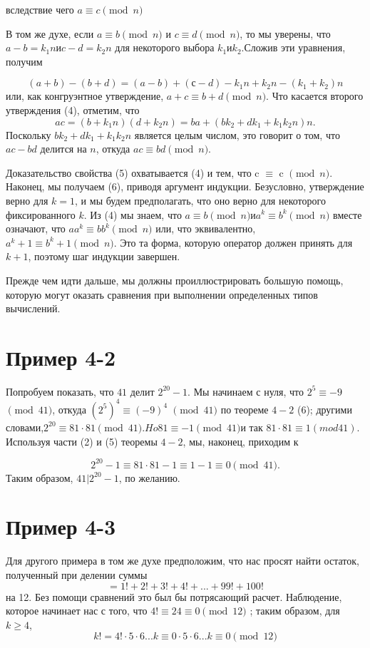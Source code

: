 \documentclass[11pt]{article}
\begin{document}
	вследствие чего $a \equiv c \pmod{n}$
	
	В том же духе, если $a \equiv b \pmod{n}$ и $c \equiv d \pmod{n}$, то мы уверены, что $a-b = k_{1}n и c-d = k_{2}n$ для некоторого выбора $k_{1} и k_{2}. $Сложив эти уравнения, получим
	
	\[
		(a + b) - (b + d) = (a-b) + (с-d) -k_{1}n + k_{2}n- (k_{1} + k_{2}) n
	\]
	или, как конгруэнтное утверждение, $a + c  \equiv b + d \pmod{n}$. Что касается второго утверждения (4), отметим, что
	\[
		 ac = (b + k_{1} n) (d + k_{2}n) = ba + (bk_{2} + dk_{1} + k_{1}k_{2}n) n.
	\]
	Поскольку $bk_{2} + dk_{1} + k_{1}k_2n$ является целым числом, это говорит о том, что $ac-bd$ делится на $n$, откуда $ac \equiv bd \pmod{n}$.
	
	Доказательство свойства (5) охватывается (4) и тем, что c $\equiv$ c $\pmod{n}$. Наконец, мы получаем (6), приводя аргумент индукции. Безусловно, утверждение верно для $k = 1$, и мы будем предполагать, что оно верно для некоторого фиксированного $k$. Из (4) мы знаем, что $a \equiv b \pmod{n} и a^{k} \equiv b^{k} \pmod{n}$ вместе означают, что $aa^{k} \equiv bb^{k} \pmod{n}$ или, что эквивалентно, $a^{k} + 1 \equiv b^{k} + 1 \pmod{n}$. Это та форма, которую оператор должен принять для $k + 1$, поэтому шаг индукции завершен.
	
	Прежде чем идти дальше, мы должны проиллюстрировать большую помощь, которую могут оказать сравнения при выполнении определенных типов вычислений.
	\section{Пример 4-2}
	Попробуем показать, что $41$ делит $2^{20} -1$. Мы начинаем с нуля, что $2^{5} \equiv - 9$ $\pmod{41}$, откуда $(2^{5})^{4} \equiv (- 9)^{4}$ $\pmod{41}$ по теореме $4-2$ (6); другими словами,$ 2^{20} \equiv 81 \cdot 81 \pmod{41}. Ho 81 \equiv - 1 \pmod{41} $и так $81 \cdot 81 \equiv 1 (mod 41).$ Используя части (2) и (5) теоремы $4-2$, мы, наконец, приходим к
	
	\[
		2^{20}-1 \equiv 81 \cdot 81-1 \equiv 1-1 \equiv 0 \pmod{41}.
	\]
	Таким образом, $41 | 2^{20}-1$, по желанию.
	\section{Пример 4-3}
	Для другого примера в том же духе предположим, что нас просят найти остаток, полученный при делении суммы
	\[=
		1! +2! +3! +4! + ... + 99! +100!
	\]
	на 12. Без помощи сравнений это был бы потрясающий расчет. Наблюдение, которое начинает нас с того, что $4! \equiv 24 \equiv 0 \pmod{12}$ ; таким образом, для $k\geq 4$,
	\[
		k! = 4! \cdot 5 \cdot 6 ... k \equiv 0 \cdot 5 \cdot 6 ... k \equiv 0
		\pmod{12}	\]
		
		

	
	
	
\end{document}
